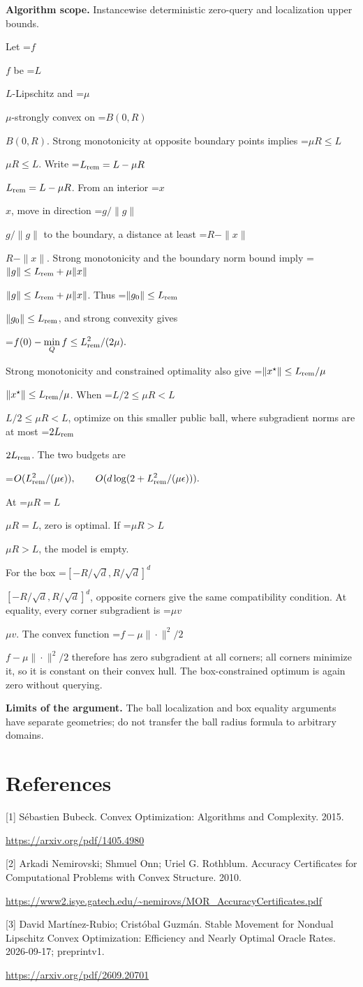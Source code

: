 \documentclass[10pt,a4paper]{article}
\newcommand{\AtlasMath}[1]{\par\begingroup\centering\setbox0=\hbox{$\displaystyle #1$}\ifdim\wd0>1.4\linewidth\typeout{ATLAS WIDE FORMULA: \the\wd0}\fi\ifdim\wd0>\linewidth\resizebox{\linewidth}{!}{\box0}\else\box0\fi\par\endgroup}
\newcommand{\AtlasInlineMath}[1]{\begingroup\setbox0=\hbox{$#1$}\ifdim\wd0>.4\linewidth\endgroup\AtlasMath{#1}\else\endgroup$#1$\fi}
\begin{document}
\textbf{Algorithm scope.} Instancewise deterministic zero-query and localization upper bounds.

Let \AtlasInlineMath{f} be \AtlasInlineMath{L}-Lipschitz and \AtlasInlineMath{\mu}-strongly convex on \AtlasInlineMath{B(0,R)}. Strong monotonicity at opposite boundary points implies \AtlasInlineMath{\mu R\le L}. Write \AtlasInlineMath{L_{\rm rem}=L-\mu R}. From an interior \AtlasInlineMath{x}, move in direction \AtlasInlineMath{g/\|g\|} to the boundary, a distance at least \AtlasInlineMath{R-\|x\|}. Strong monotonicity and the boundary norm bound imply
\AtlasInlineMath{\|g\|\le L_{\rm rem}+\mu\|x\|}.
Thus \AtlasInlineMath{\|g_0\|\le L_{\rm rem}}, and strong convexity gives

\AtlasMath{f(0)-\min_Qf\le L_{\rm rem}^2/(2\mu).}

Strong monotonicity and constrained optimality also give \AtlasInlineMath{\|x^\star\|\le L_{\rm rem}/\mu}. When \AtlasInlineMath{L/2\le\mu R<L}, optimize on this smaller public ball, where subgradient norms are at most \AtlasInlineMath{2L_{\rm rem}}. The two budgets are

\AtlasMath{O(L_{\rm rem}^2/(\mu\epsilon)),\qquad
O(d\log(2+L_{\rm rem}^2/(\mu\epsilon))).}

At \AtlasInlineMath{\mu R=L}, zero is optimal. If \AtlasInlineMath{\mu R>L}, the model is empty.

For the box \AtlasInlineMath{[-R/\sqrt d,R/\sqrt d]^d}, opposite corners give the same compatibility condition. At equality, every corner subgradient is \AtlasInlineMath{\mu v}. The convex function \AtlasInlineMath{f-\mu\|\cdot\|^2/2} therefore has zero subgradient at all corners; all corners minimize it, so it is constant on their convex hull. The box-constrained optimum is again zero without querying.

\textbf{Limits of the argument.} The ball localization and box equality arguments have separate geometries; do not transfer the ball radius formula to arbitrary domains.

\section{References}
[1] Sébastien Bubeck. Convex Optimization: Algorithms and Complexity. 2015.

\url{https://arxiv.org/pdf/1405.4980}

[2] Arkadi Nemirovski; Shmuel Onn; Uriel G. Rothblum. Accuracy Certificates for Computational Problems with Convex Structure. 2010.

\url{https://www2.isye.gatech.edu/~nemirovs/MOR_AccuracyCertificates.pdf}

[3] David Martínez-Rubio; Cristóbal Guzmán. Stable Movement for Nondual Lipschitz Convex Optimization: Efficiency and Nearly Optimal Oracle Rates. 2026-09-17; preprintv1.

\url{https://arxiv.org/pdf/2609.20701}
\end{document}
